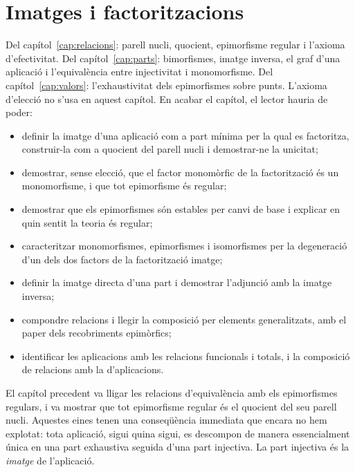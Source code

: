 \chapter{Imatges i factoritzacions}\label{cap:imatges}

\begin{objectius}
 Del capítol~\ref{cap:relacions}: parell nucli, quocient, epimorfisme regular i l'axioma d'efectivitat. Del capítol~\ref{cap:parts}: bimorfismes, imatge inversa, el graf d'una aplicació i l'equivalència entre injectivitat i monomorfisme. Del capítol~\ref{cap:valors}: l'exhaustivitat dels epimorfismes sobre punts. L'axioma d'elecció no s'usa en aquest capítol.
 En acabar el capítol, el lector hauria de poder:
\begin{itemize}
  \item definir la imatge d'una aplicació com a part mínima per la qual es factoritza, construir-la com a quocient del parell nucli i demostrar-ne la unicitat;
  \item demostrar, sense elecció, que el factor monomòrfic de la factorització és un monomorfisme, i que tot epimorfisme és regular;
  \item demostrar que els epimorfismes són estables per canvi de base i explicar en quin sentit la teoria és regular;
  \item caracteritzar monomorfismes, epimorfismes i isomorfismes per la degeneració d'un dels dos factors de la factorització imatge;
  \item definir la imatge directa d'una part i demostrar l'adjunció amb la imatge inversa;
  \item compondre relacions i llegir la composició per elements generalitzats, amb el paper dels recobriments epimòrfics;
  \item identificar les aplicacions amb les relacions funcionals i totals, i la composició de relacions amb la d'aplicacions.
\end{itemize}
\end{objectius}

El capítol precedent va lligar les relacions d'equivalència amb els
epimorfismes regulars, i va mostrar que tot epimorfisme regular és el
quocient del seu parell nucli. Aquestes eines tenen una conseqüència
immediata que encara no hem explotat: tota aplicació, sigui quina sigui,
es descompon de manera essencialment única en una part exhaustiva seguida
d'una part injectiva. La part injectiva és la \emph{imatge} de
l'aplicació.

